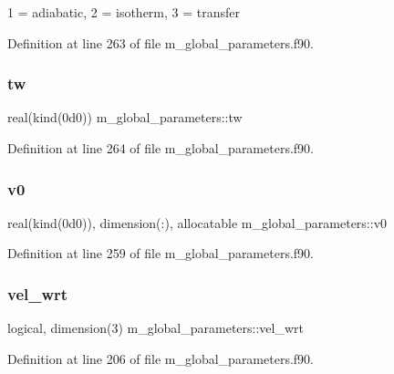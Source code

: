1 = adiabatic, 2 = isotherm, 3 = transfer 



Definition at line 263 of file m\+\_\+global\+\_\+parameters.\+f90.

\mbox{\label{namespacem__global__parameters_aa77b0836fe22478b69e10e656ef7fcc2}} 
\subsubsection{\texorpdfstring{tw}{tw}}
{\footnotesize\ttfamily real(kind(0d0)) m\+\_\+global\+\_\+parameters\+::tw}



Definition at line 264 of file m\+\_\+global\+\_\+parameters.\+f90.

\mbox{\label{namespacem__global__parameters_a334b440356a4353d073c43e68c2372da}} 
\subsubsection{\texorpdfstring{v0}{v0}}
{\footnotesize\ttfamily real(kind(0d0)), dimension(\+:), allocatable m\+\_\+global\+\_\+parameters\+::v0}



Definition at line 259 of file m\+\_\+global\+\_\+parameters.\+f90.

\mbox{\label{namespacem__global__parameters_ae4ab7caa7dee5e616b217437f7f2b87f}} 
\subsubsection{\texorpdfstring{vel\+\_\+wrt}{vel\_wrt}}
{\footnotesize\ttfamily logical, dimension(3) m\+\_\+global\+\_\+parameters\+::vel\+\_\+wrt}



Definition at line 206 of file m\+\_\+global\+\_\+parameters.\+f90.

